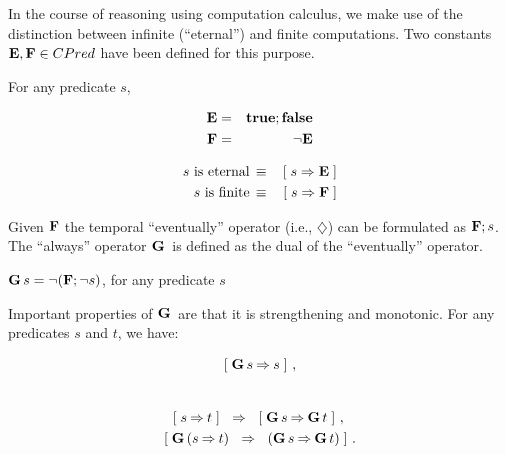 In the course of reasoning using computation calculus, we make use of
the distinction between infinite (``eternal'') and finite
computations.  Two constants $\mathbf{E}, \mathbf{F} \in CPred$ have been defined for
this purpose. 
\begin{Definition} For any predicate $s$,\\
  \begin{minipage}{0.4\linewidth}
    \begin{eqnarray}
      \mathbf{E} & = & \mathbf{true};\mathbf{false} \label{eq:comp-eternal} \\
      \mathbf{F} & = & \neg \mathbf{E} \label{eq:comp-finite}
    \end{eqnarray}
  \end{minipage}
  \hfill
  \begin{minipage}{0.4\linewidth}
    \begin{eqnarray}
      \textrm{$s$ is eternal} & \, \equiv \, & [\; s \Rightarrow \mathbf{E} \;] \label{eq:comp-s-eternal} \\
      \textrm{$s$ is finite} & \, \equiv\, & [\; s \Rightarrow \mathbf{F} \;] \label{eq:comp-s-finite}
    \end{eqnarray}
  \end{minipage}
\end{Definition}
Given $\mathbf{F}$ the temporal ``eventually'' operator (i.e., $\diamondsuit$)
can be formulated as $\mathbf{F};s$.  The ``always'' operator $\mathbf{G}\,$ is defined
as the dual of the ``eventually'' operator.
\begin{Definition}
  $\mathbf{G}\, s = \neg(\mathbf{F};\neg s)$, for any predicate $s$
\end{Definition}
Important properties of $\mathbf{G}\,$ are that it is strengthening and
monotonic.  For any predicates $s$ and $t$, we have:

  \begin{minipage}{0.3\linewidth}
	\begin{align}
	  \label{eq:g-strengthen}
	  [\; \mathbf{G}\, s \mathbin\Rightarrow s \;]~, \\
	  \nonumber
	\end{align}
  \end{minipage}
  \hfill
  \begin{minipage}{0.5\linewidth}
    \begin{align}
      \label{eq:g-monotonic}
      \ew{s \limp t} \Wide{&\limp} \ew{\G s \limp \G t}~, \\ 
	\ew{ \G (s \limp t) &\Wide{\limp} (\G s \limp \G t) }~.
    \end{align}
  \end{minipage}

